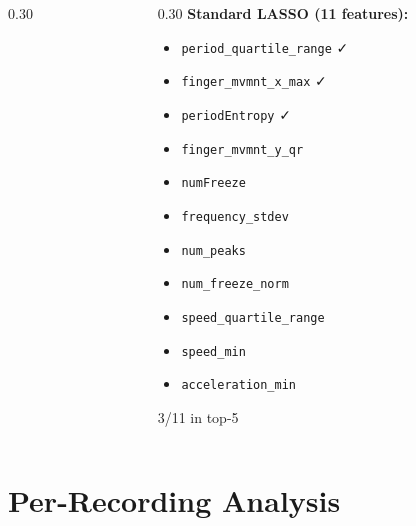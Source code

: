 \documentclass[aspectratio=169]{beamer}
\begin{document}
\begin{frame}
\begin{columns}[T]
\begin{column}{0.30\textwidth}
        \end{column}
        \begin{column}{0.30\textwidth}
            \textbf{Standard LASSO (11 features):}
            \begin{itemize}\footnotesize
                \item \texttt{period\_quartile\_range} ✓
                \item \texttt{finger\_mvmnt\_x\_max} ✓
                \item \texttt{periodEntropy} ✓
                \item \texttt{finger\_mvmnt\_y\_qr}
                \item \texttt{numFreeze}
                \item \texttt{frequency\_stdev}
                \item \texttt{num\_peaks}
                \item \texttt{num\_freeze\_norm}
                \item \texttt{speed\_quartile\_range}
                \item \texttt{speed\_min}
                \item \texttt{acceleration\_min}
            \end{itemize}
            \vspace{0.3em}
            {\footnotesize 3/11 in top-5}
        \end{column}
    \end{columns}
\end{frame}

\section{Per-Recording Analysis}
\end{document}
